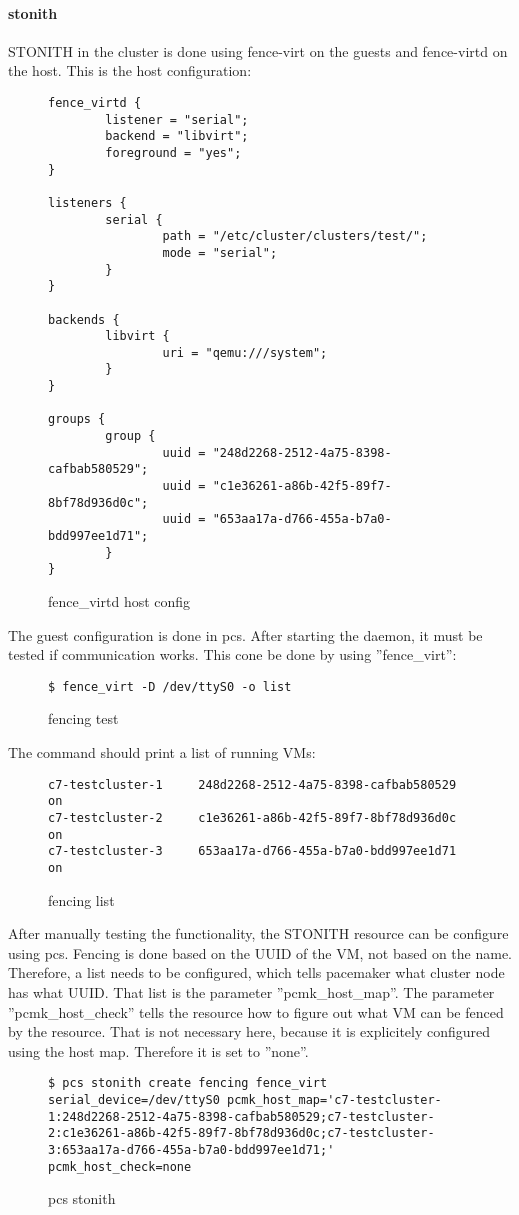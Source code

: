\paragraph{stonith}
\ac{STONITH} in the cluster is done using fence-virt on the guests and fence-virtd on
the host.
This is the host configuration:
\begin{figure}
\begin{lstlisting}
fence_virtd {
        listener = "serial";
        backend = "libvirt";
        foreground = "yes";
}

listeners {
        serial {
                path = "/etc/cluster/clusters/test/";
                mode = "serial";
        }
}

backends {
        libvirt { 
                uri = "qemu:///system";
        }
}

groups {
        group {
                uuid = "248d2268-2512-4a75-8398-cafbab580529";
                uuid = "c1e36261-a86b-42f5-89f7-8bf78d936d0c";
                uuid = "653aa17a-d766-455a-b7a0-bdd997ee1d71";
        }
}

\end{lstlisting}
\caption{fence\_virtd host config}
\end{figure}
The guest configuration is done in pcs. After starting the daemon, it must be tested
if communication works. This cone be done by using ''fence\_virt'':
\begin{figure}
\begin{lstlisting}
$ fence_virt -D /dev/ttyS0 -o list
\end{lstlisting}
\caption{fencing test}
\end{figure}
The command should print a list of running \acp{VM}:
\begin{figure}
\begin{lstlisting}
c7-testcluster-1     248d2268-2512-4a75-8398-cafbab580529 on
c7-testcluster-2     c1e36261-a86b-42f5-89f7-8bf78d936d0c on
c7-testcluster-3     653aa17a-d766-455a-b7a0-bdd997ee1d71 on
\end{lstlisting}
\caption{fencing list}
\end{figure}
After manually testing the functionality, the \ac{STONITH} resource can be configure
using pcs. Fencing is done based on the \ac{UUID} of the \ac{VM}, not based on the name.
Therefore, a list needs to be configured, which tells pacemaker what cluster node has what 
\ac{UUID}. That list is the parameter ''pcmk\_host\_map''. The parameter ''pcmk\_host\_check'' tells
the resource how to figure out what \acs{VM} can be fenced by the resource. That is not necessary here,
because it is explicitely configured using the host map. Therefore it is set to ''none''.
\begin{figure}
\begin{lstlisting}
$ pcs stonith create fencing fence_virt serial_device=/dev/ttyS0 pcmk_host_map='c7-testcluster-1:248d2268-2512-4a75-8398-cafbab580529;c7-testcluster-2:c1e36261-a86b-42f5-89f7-8bf78d936d0c;c7-testcluster-3:653aa17a-d766-455a-b7a0-bdd997ee1d71;' pcmk_host_check=none
\end{lstlisting}
\caption{pcs stonith}
\end{figure}
